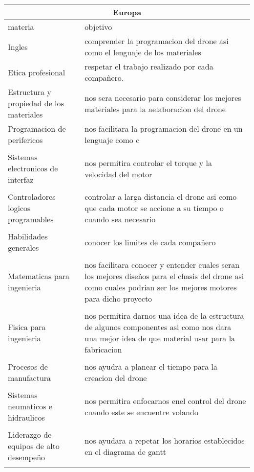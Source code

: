 \documentclass[12pt]{report}
\begin{document}
{\begin{table}[htb]
\centering
\begin{tabular}{| p{5.2cm}| p{10.2cm} |}
\hline
\multicolumn{2}{|c|}{Europa} \\
\hline
materia & objetivo \\
\hline \hline
Ingles & comprender la programacion del drone asi como el lenguaje de los materiales \\ \hline
Etica profesional & respetar el trabajo realizado por cada compañero. \\ \hline
Estructura y propiedad de los materiales & nos sera necesario para considerar los mejores materiales para la aelaboracion del drone \\ \hline
Programacion de perifericos & nos facilitara la programacion del drone en un lenguaje como c \\ \hline\\
Sistemas electronicos de interfaz & nos permitira controlar el torque y la velocidad del motor \\ \hline\\
Controladores logicos programables & controlar a larga distancia el drone asi como que cada motor se accione a su tiempo o cuando sea necesario \\ \hline\\
Habilidades generales & conocer los limites de cada compañero \\ \hline\\
Matematicas para ingenieria & nos facilitara conocer y entender cuales seran los mejores diseños para el chasis del drone asi como cuales podrian ser los mejores motores para dicho proyecto \\ \hline\\
Fisica para ingenieria & nos permitira darnos una idea de la estructura de algunos componentes asi como nos dara una mejor idea de que material usar para la fabricacion \\ \hline\\
Procesos  de manufactura & nos ayudra a planear el tiempo para la creacion del drone \\ \hline\\
Sistemas neumaticos e hidraulicos & nos permitira enfocarnos enel control del drone cuando este se encuentre volando \\ \hline\\
Liderazgo de equipos de alto desempeño & nos ayudara a repetar los horarios establecidos en el diagrama de gantt \\ \hline\\

\end{tabular}
\end{table}}
\end{document}
